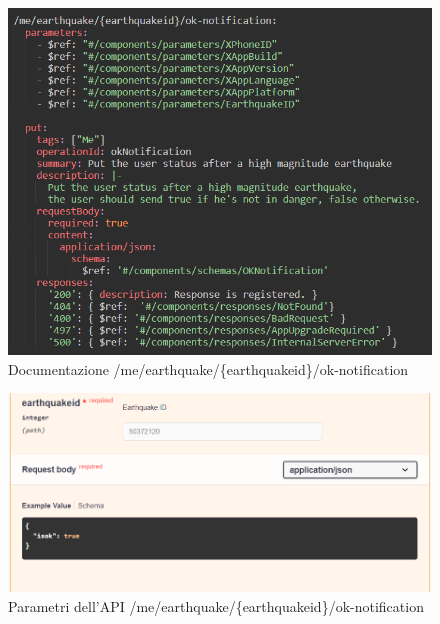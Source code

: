 \documentclass[main.tex]{subfiles}
\begin{document}
\begin{figure}[H]
    \centering
    \includegraphics[width=1\linewidth]{img/Post-Earthquake/ok-notification-api.png}
    \caption{Documentazione /me/earthquake/\{earthquakeid\}/ok-notification}
    \label{fig:OK-notification-openapi}
\end{figure}
\begin{figure}[H]
    \centering
    \includegraphics[width=1\linewidth]{img/Post-Earthquake/ok-notification-api-parameters.png}
    \caption{Parametri dell'API /me/earthquake/\{earthquakeid\}/ok-notification}
    \label{fig:OK-notification-openapi-parameters}
\end{figure}
\end{document}
